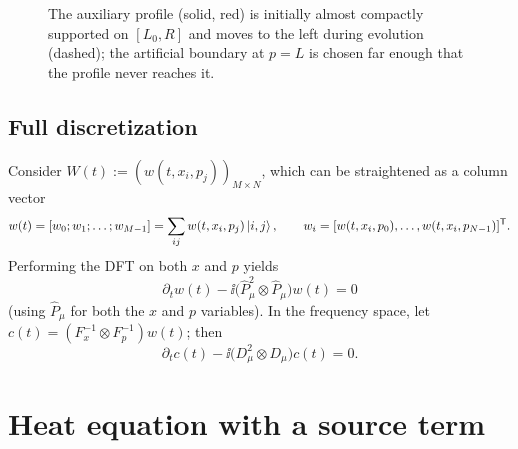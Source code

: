 \begin{figure}[ht]
  \centering
  \caption{The auxiliary profile (solid, red) is initially almost compactly
    supported on $[L_0, R]$ and moves to the left during evolution (dashed);
    the artificial boundary at $p = L$ is chosen far enough that the profile
    never reaches it.}
  \label{fig:sec05-spectral}
\end{figure}

\subsection{Full discretization}\label{sec:sec05-full}

Consider $W(t) := (w(t, x_i, p_j))_{M \times N}$, which can be straightened as a
column vector
\begin{equation}
  w(t) = [w_0; w_1; \dots; w_{M-1}] = \sum_{ij} w(t, x_i, p_j)\ket{i, j},
  \qquad w_i = [w(t, x_i, p_0), \dots, w(t, x_i, p_{N-1})]^{\mathsf{T}}.
\end{equation}
Performing the DFT on both $x$ and $p$ yields
\begin{equation}
  \partial_t w(t) - \ii\bigl(\hat{P}_\mu^2 \otimes \hat{P}_\mu\bigr) w(t) = 0
\end{equation}
(using $\hat{P}_\mu$ for both the $x$ and $p$ variables). In the frequency space,
let $c(t) = (F_x^{-1} \otimes F_p^{-1}) w(t)$; then
\begin{equation}
  \partial_t c(t) - \ii\bigl(D_\mu^2 \otimes D_\mu\bigr) c(t) = 0.
\end{equation}

\section{Heat equation with a source term}\label{sec:sec05-source}

